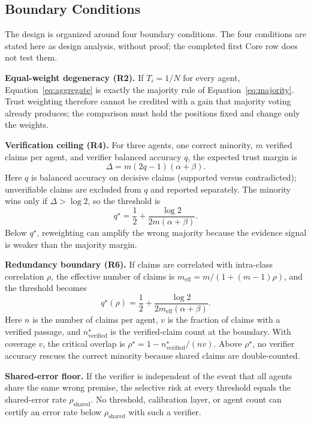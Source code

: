 \documentclass[a4paper,fleqn]{cas-sc}
\begin{document}
\subsection{Boundary Conditions}
The design is organized around four boundary conditions. The four conditions are stated here as design analysis, without proof; the completed first Core row does not test them.

\textbf{Equal-weight degeneracy (R2).} If $T_i = 1/N$ for every agent, Equation~\eqref{eq:aggregate} is exactly the majority rule of Equation~\eqref{eq:majority}. Trust weighting therefore cannot be credited with a gain that majority voting already produces; the comparison must hold the positions fixed and change only the weights.

\textbf{Verification ceiling (R4).} For three agents, one correct minority, $m$ verified claims per agent, and verifier balanced accuracy $q$, the expected trust margin is
\begin{equation}\label{eq:margin}
  \Delta = m(2q-1)(\alpha+\beta).
\end{equation}
Here $q$ is balanced accuracy on decisive claims (supported versus contradicted); unverifiable claims are excluded from $q$ and reported separately.
The minority wins only if $\Delta > \log 2$, so the threshold is
\begin{equation}\label{eq:qstar}
  q^{\star} = \frac{1}{2} + \frac{\log 2}{2m(\alpha+\beta)}.
\end{equation}
Below $q^{\star}$, reweighting can amplify the wrong majority because the evidence signal is weaker than the majority margin.

\textbf{Redundancy boundary (R6).} If claims are correlated with intra-class correlation $\rho$, the effective number of claims is $m_{\text{eff}} = m/(1+(m-1)\rho)$, and the threshold becomes
\begin{equation}\label{eq:qstar-rho}
  q^{\star}(\rho) = \frac{1}{2} + \frac{\log 2}{2m_{\text{eff}}(\alpha+\beta)}.
\end{equation}
Here $n$ is the number of claims per agent, $v$ is the fraction of claims with a verified passage, and $n^{\star}_{\text{verified}}$ is the verified-claim count at the boundary. With coverage $v$, the critical overlap is $\rho^{\star} = 1 - n^{\star}_{\text{verified}}/(nv)$. Above $\rho^{\star}$, no verifier accuracy rescues the correct minority because shared claims are double-counted.

\textbf{Shared-error floor.} If the verifier is independent of the event that all agents share the same wrong premise, the selective risk at every threshold equals the shared-error rate $\rho_{\mathrm{shared}}$. No threshold, calibration layer, or agent count can certify an error rate below $\rho_{\mathrm{shared}}$ with such a verifier.
\end{document}
